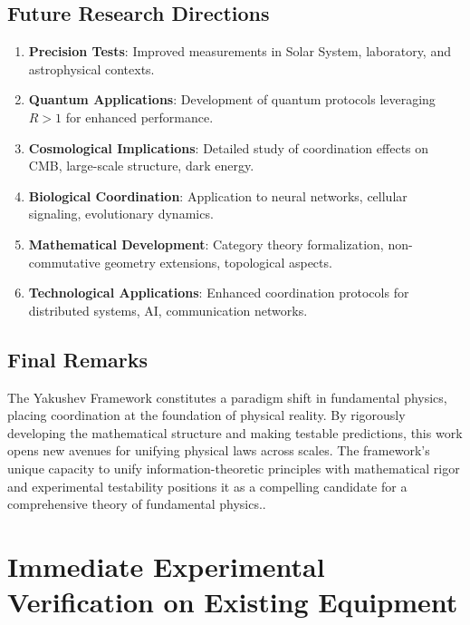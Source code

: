 \documentclass[11pt,a4paper]{article}
\begin{document}
	\subsection{Future Research Directions}
	
	\begin{enumerate}
		\item \textbf{Precision Tests}: Improved measurements in Solar System, laboratory, and astrophysical contexts.
		
		\item \textbf{Quantum Applications}: Development of quantum protocols leveraging $R>1$ for enhanced performance.
		
		\item \textbf{Cosmological Implications}: Detailed study of coordination effects on CMB, large-scale structure, dark energy.
		
		\item \textbf{Biological Coordination}: Application to neural networks, cellular signaling, evolutionary dynamics.
		
		\item \textbf{Mathematical Development}: Category theory formalization, non-commutative geometry extensions, topological aspects.
		
		\item \textbf{Technological Applications}: Enhanced coordination protocols for distributed systems, AI, communication networks.
	\end{enumerate}
	
	\subsection{Final Remarks}
	
	The Yakushev Framework constitutes a paradigm shift in fundamental physics, placing coordination at the foundation of physical reality. By rigorously developing the mathematical structure and making testable predictions, this work opens new avenues for unifying physical laws across scales. The framework's unique capacity to unify information-theoretic principles with mathematical rigor and experimental testability positions it as a compelling candidate for a comprehensive theory of fundamental physics..
	\section{Immediate Experimental Verification on Existing Equipment}
	\label{sec:immediate-verification}
	
\end{document}
